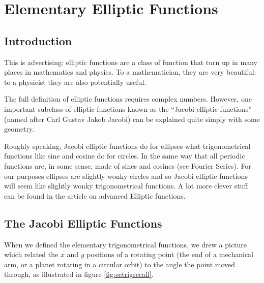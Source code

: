 \documentclass[main.tex]{subfiles}
\begin{document}
\section{Elementary Elliptic Functions}

\subsection{Introduction}

This is advertising: elliptic functions are a class of function that turn up in many places in mathematics and physics. To a mathematician, they are very beautiful: to a physicist they are also potentially useful. 

The full definition of elliptic functions requires complex numbers. However, one important subclass of elliptic functions known as the ``Jacobi elliptic functions'' (named after Carl Gustav Jakob Jacobi) can be explained quite simply with some geometry.

Roughly speaking, Jacobi elliptic functions do for ellipses what trigonometrical functions like sine and cosine do for circles. In the same way that all periodic functions are, in some sense, made of sines and cosines (see Fourier Series). For our purposes ellipses are slightly wonky circles and so Jacobi elliptic functions will seem like slightly wonky trigonometrical functions. A lot more clever stuff can be found in the article on advanced Elliptic functions.

\subsection{The Jacobi Elliptic Functions}
When we defined the elementary trigonometrical functions, we drew a picture which related the $x$ and $y$ positions of a rotating point (the end of a mechanical arm, or a planet rotating in a circular orbit) to the angle the point moved through, as illustrated in figure \ref{fig:eetrigrecall}.
\end{document}
